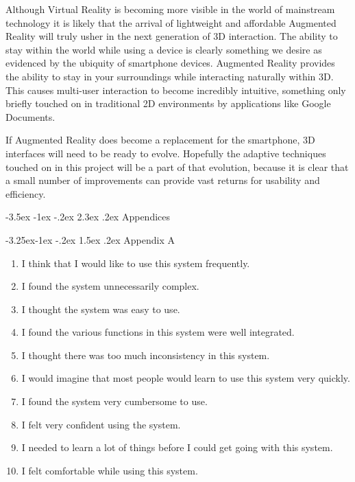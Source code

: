 \documentclass[12pt]{article}
\makeatletter
\renewcommand{\section}{\@startsection {section}{1}{\z@}%
             {-3.5ex \@plus -1ex \@minus -.2ex}%
             {2.3ex \@plus .2ex}%
             {\normalfont\Large\scshape\bfseries}}
\renewcommand{\subsection}{\@startsection{subsection}{2}{\z@}%
             {-3.25ex\@plus -1ex \@minus -.2ex}%
             {1.5ex \@plus .2ex}%
             {\normalfont\large\scshape\bfseries}}
\makeatother
\begin{document}
Although Virtual Reality is becoming more visible in the world of mainstream technology it is likely that the arrival of lightweight and affordable Augmented Reality will truly usher in the next generation of 3D interaction. The ability to stay within the world while using a device is clearly something we desire as evidenced by the ubiquity of smartphone devices. Augmented Reality provides the ability to stay in your surroundings while interacting naturally within 3D. This causes multi-user interaction to become incredibly intuitive, something only briefly touched on in traditional 2D environments by applications like Google Documents.

If Augmented Reality does become a replacement for the smartphone, 3D interfaces will need to be ready to evolve. Hopefully the adaptive techniques touched on in this project will be a part of that evolution, because it is clear that a small number of improvements can provide vast returns for usability and efficiency.

\pagebreak

\section{Appendices}

\subsection{Appendix A}

\begin{enumerate}
\item I think that I would like to use this system frequently.
\item I found the system unnecessarily complex. 
\item I thought the system was easy to use. 
\item I found the various functions in this system were well integrated. 
\item I thought there was too much inconsistency in this system. 
\item I would imagine that most people would learn to use this system very quickly. 
\item I found the system very cumbersome to use. 
\item I felt very confident using the system.
\item I needed to learn a lot of things before I could get going with this system. 
\item I felt comfortable while using this system.
\end{enumerate}
\end{document}
